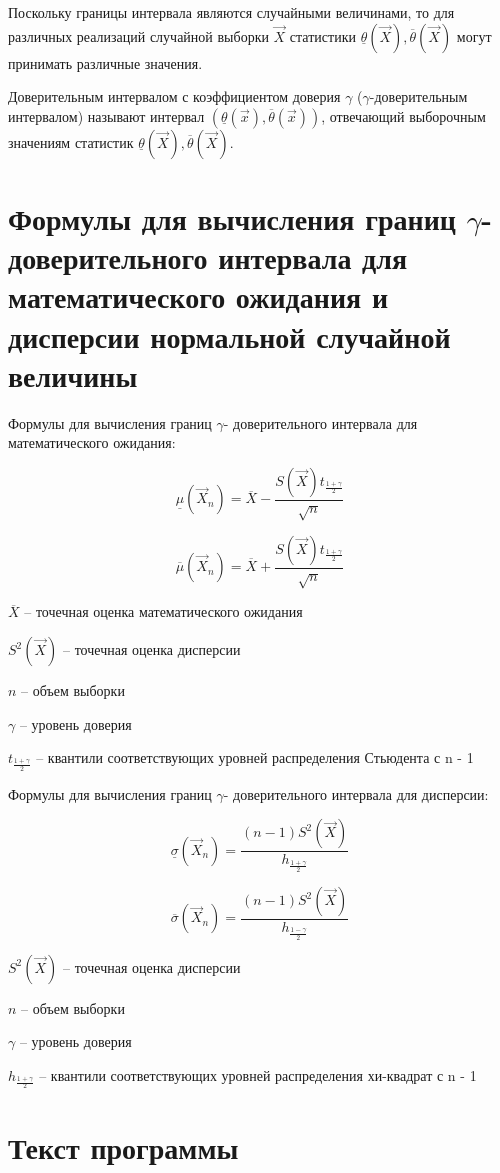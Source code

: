 \documentclass[a4paper,14pt]{extreport} %
\begin{document}
Поскольку границы интервала являются случайными величинами, то для различных реализаций случайной выборки $\vec X$ статистики $\underline{\theta}(\vec X), \overline{\theta}(\vec X)$ могут принимать различные значения.

Доверительным интервалом с коэффициентом доверия $\gamma$ ($\gamma$-доверительным интервалом) называют интервал $(\underline{\theta}(\vec x), \overline{\theta}(\vec x))$, отвечающий выборочным значениям статистик $\underline{\theta}(\vec X), \overline{\theta}(\vec X)$. 

\section{Формулы для вычисления границ $\gamma$- доверительного интервала для математического ожидания и дисперсии нормальной случайной величины}

Формулы для вычисления границ $\gamma$- доверительного интервала для математического ожидания:

$$
\underline\mu(\vec X_n)=\overline X - \frac{S(\vec X)t_{\frac{1+\gamma}{2}}}{\sqrt{n}}
$$

$$
\overline\mu(\vec X_n)=\overline X + \frac{S(\vec X)t_{\frac{1+\gamma}{2}}}{\sqrt{n}}
$$

$\overline X$ -- точечная оценка математического ожидания

$S^2(\vec X)$ -- точечная оценка дисперсии

$n$ -- объем выборки

$\gamma$ -- уровень доверия

$t_{\frac{1+\gamma}{2}}$ -- квантили соответствующих уровней распределения Стьюдента с n - 1

Формулы для вычисления границ $\gamma$- доверительного интервала для дисперсии:

$$
\underline\sigma(\vec X_n)= \frac{(n-1)S^2(\vec X)}{h_{\frac{1+\gamma}{2}}}
$$

$$
\overline\sigma(\vec X_n)= \frac{(n-1)S^2(\vec X)}{h_{\frac{1-\gamma}{2}}}
$$

$S^2(\vec X)$ -- точечная оценка дисперсии

$n$ -- объем выборки

$\gamma$ -- уровень доверия

$h_{\frac{1+\gamma}{2}}$ -- квантили соответствующих уровней распределения хи-квадрат с n - 1

\section{Текст программы}
\end{document}

